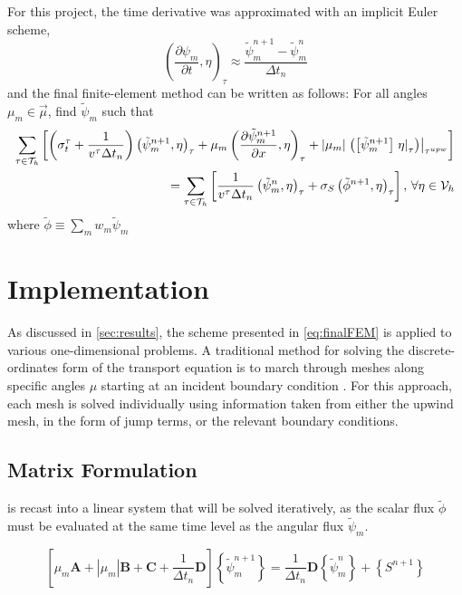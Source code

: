\documentclass{article}
\newcommand{\tauh}{\mathcal{T}_h}
\newcommand{\pdiff}[2]{\frac{\partial#1}{\partial#2}}
\newcommand{\ddx}[1]{\pdiff{#1}{x}}
\newcommand{\ddt}[1]{\pdiff{#1}{t}}
\newcommand{\dpmdt}{\ddt{\psi_m}}
\newcommand{\sumTaus}{\sum_{\tauinT}}
\newcommand{\tfem}{finite-element method }
\newcommand{\tauinT}{\tau\in\tauh}
\newcommand{\fepsim}{\tilde{\psi}_m}
\newcommand{\innerProd}[2]{\left(#1,#2\right)}
\newcommand{\tauInt}[2]{\innerProd{#1}{#2}_\tau}
\newcommand{\inTau}[1]{\left.#1\right\vert_{\tau}}
\newcommand{\fephi}{\tilde{\phi}}
\newcommand{\mabs}[1]{\left|#1\right|}
\newcommand{\jump}[1]{\left[#1\right]}
\newcommand{\asMatrix}[1]{\mathbf{#1}}
\newcommand{\asVector}[1]{\left\lbrace#1\right\rbrace}
\begin{document}
For this project, the time derivative was approximated with an implicit Euler scheme, 
\begin{equation}
    \label{eq:timeDeriv}
    \tauInt{\dpmdt}{\eta}\approx\frac{\fepsim^{n+1}-\fepsim^n}{\Delta t_n}
\end{equation}
and the final \tfem can be written as follows: For all angles $\mu_m\in\vec{\mu}$, find $\fepsim$ such that
\begin{equation}
    \label{eq:finalFEM}
    \begin{split}
        \sumTaus\left[
            \left(\sigma_t^\tau+\frac{1}{v^\tau\Delta t_n}\right)\tauInt{\fepsim^{n+1}}{\eta}
            +\mu_m\tauInt{\ddx{\fepsim^{n+1}}}{\eta}
            +\mabs{\mu_m}\left.\left(\jump{\fepsim^{n+1}}\inTau{\eta}\right)\right|_{\tau^{upw}}
            \right] \\
        = \sumTaus\left[
            \frac{1}{v^\tau\Delta t_n}\tauInt{\fepsim^n}{\eta}
            +\sigma_S\tauInt{\fephi^{n+1}}{\eta}
            \right]
        \forEtaInV
    \end{split}
\end{equation}
where $\fephi\equiv\sum_mw_m\fepsim$

\section{Implementation} \label{sec:implement}
As discussed in \cref{sec:results}, the scheme presented in \cref{eq:finalFEM} is applied to
various one-dimensional problems. 
A traditional method for solving the discrete-ordinates form of the transport equation 
is to march through meshes along specific angles $\mu$ starting at an incident 
boundary condition \cite{lewis1984computational}.
For this approach, each mesh is solved individually using information taken from
either the upwind mesh, in the form of jump terms, or the relevant boundary conditions.

\subsection{Matrix Formulation}

 is recast into a linear system that will be solved iteratively, as the
scalar flux $\fephi$ must be evaluated at the same time level as the angular flux $\fepsim$.

\begin{equation}
    \label{eq:matrixFEM}
    \left[
        \mu_m\asMatrix{A}+\mabs{\mu_m}\asMatrix{B} + \asMatrix{C}
        +\frac{1}{\Delta t_n}\asMatrix{D}
    \right]
    \asVector{\fepsim^{n+1}}
    =\frac{1}{\Delta t_n}\asMatrix{D}\asVector{\fepsim^n}+\asVector{S^{n+1}}
\end{equation}
\end{document}
